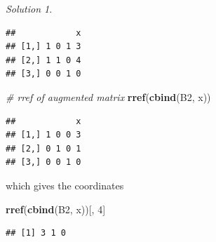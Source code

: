 \documentclass[
]{book}
\newenvironment{Shaded}{\begin{snugshade}}{\end{snugshade}}
\newcommand{\CommentTok}[1]{\textcolor[rgb]{0.56,0.35,0.01}{\textit{#1}}}
\newcommand{\DecValTok}[1]{\textcolor[rgb]{0.00,0.00,0.81}{#1}}
\newcommand{\KeywordTok}[1]{\textcolor[rgb]{0.13,0.29,0.53}{\textbf{#1}}}
\newcommand{\NormalTok}[1]{#1}
\theoremstyle{definition}
\theoremstyle{definition}
\theoremstyle{definition}
\theoremstyle{remark}
\newtheorem*{solution}{Solution}
\begin{document}
\begin{solution}
\begin{verbatim}
##            x
## [1,] 1 0 1 3
## [2,] 1 1 0 4
## [3,] 0 0 1 0
\end{verbatim}

\begin{Shaded}
\begin{Highlighting}[]
\CommentTok{# rref of augmented matrix}
\KeywordTok{rref}\NormalTok{(}\KeywordTok{cbind}\NormalTok{(B2, x))}
\end{Highlighting}
\end{Shaded}

\begin{verbatim}
##            x
## [1,] 1 0 0 3
## [2,] 0 1 0 1
## [3,] 0 0 1 0
\end{verbatim}

which gives the coordinates

\begin{Shaded}
\begin{Highlighting}[]
\KeywordTok{rref}\NormalTok{(}\KeywordTok{cbind}\NormalTok{(B2, x))[, }\DecValTok{4}\NormalTok{]}
\end{Highlighting}
\end{Shaded}

\begin{verbatim}
## [1] 3 1 0
\end{verbatim}

\end{solution}
\end{document}
